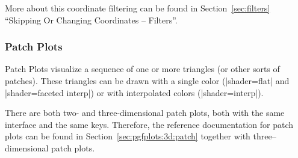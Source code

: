 {More about this coordinate filtering can be found in Section~\ref{sec:filters} ``Skipping Or Changing Coordinates -- Filters''.

\subsubsection{Patch Plots}
Patch Plots visualize a sequence of one or more triangles (or other sorts of patches). These triangles can be drawn with a single color (|shader=flat| and |shader=faceted interp|) or with interpolated colors (|shader=interp|).

There are both two- and three-dimensional patch plots, both with the same interface and the same keys. Therefore, the reference documentation for patch plots can be found in Section~\ref{sec:pgfplots:3d:patch} together with three--dimensional patch plots.

\label{sec:pgfplots:2d:patch}
}
